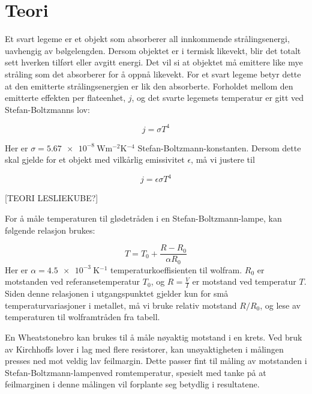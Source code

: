 \section{Teori}
Et svart legeme er et objekt som absorberer all innkommende strålingsenergi, uavhengig av bølgelengden. Dersom objektet er i termisk likevekt, blir det totalt sett hverken tilført eller avgitt energi. Det vil si at objektet må emittere like mye stråling som det absorberer for å oppnå likevekt. For et svart legeme betyr dette at den emitterte strålingsenergien er lik den absorberte. Forholdet mellom den emitterte effekten per flateenhet, $j$, og det svarte legemets temperatur er gitt ved Stefan-Boltzmanns lov:

\begin{equation}
  j = \sigma T^4
\label{eq:SB} %
\end{equation}

Her er $\sigma = \SI{5,67e-8}{\watt\metre^{-2}\kelvin^{-4}}$ Stefan-Boltzmann-konstanten. Dersom dette skal gjelde for et objekt med vilkårlig emissivitet $\epsilon$, må vi justere til

\begin{equation}
  j = \epsilon\sigma T^4
\label{eq:SBepsilon} %
\end{equation}

[TEORI LESLIEKUBE?]

For å måle temperaturen til glødetråden i en Stefan-Boltzmann-lampe, kan følgende relasjon brukes:

\begin{equation}
  T=T_0+\frac{R-R_0}{\alpha R_0}
\label{eq:TempMetall} 
\end{equation}
Her er $\alpha=\SI{4,5e-3}{\kelvin^{-1}}$ temperaturkoeffisienten til wolfram. $R_0$ er motstanden ved referansetemperatur $T_0$, og $R=\frac{V}{I}$ er motstand ved temperatur $T$. Siden denne relasjonen i utgangspunktet gjelder kun for små temperaturvariasjoner i metallet, må vi bruke relativ motstand $R/R_0$, og lese av temperaturen til wolframtråden fra tabell.

En Wheatstonebro kan brukes til å måle nøyaktig motstand i en krets. Ved bruk av Kirchhoffs lover i lag med flere resistorer, kan unøyaktigheten i målingen presses ned mot veldig lav feilmargin. Dette passer fint til måling av motstanden i Stefan-Boltzmann-lampenved romtemperatur, spesielt med tanke på at feilmarginen i denne målingen vil forplante seg betydlig i resultatene.

